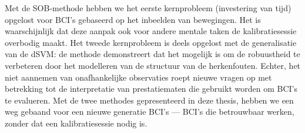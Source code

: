 Met de SOB-methode hebben we het eerste kernprobleem (investering van
tijd) opgelost voor BCI's gebaseerd op het inbeelden van bewegingen. Het is
waarschijnlijk dat deze aanpak ook voor andere mentale taken de
kalibratiesessie overbodig maakt. Het tweede kernprobleem is deels opgelost met
de generalisatie van de \ac{dSVM}: de methode demonstreert dat het mogelijk is
om de robuustheid te verbeteren door het modelleren van de structuur van de
herkenfouten. Echter, het niet aannemen van onafhankelijke observaties roept
nieuwe vragen op met betrekking tot de interpretatie van prestatiematen die
gebruikt worden om BCI's te evalueren. Met de twee methodes gepresenteerd in
deze thesis, hebben we een weg gebaand voor een nieuwe generatie BCI's --- BCI's
die betrouwbaar werken, zonder dat een kalibratiesessie nodig is.

